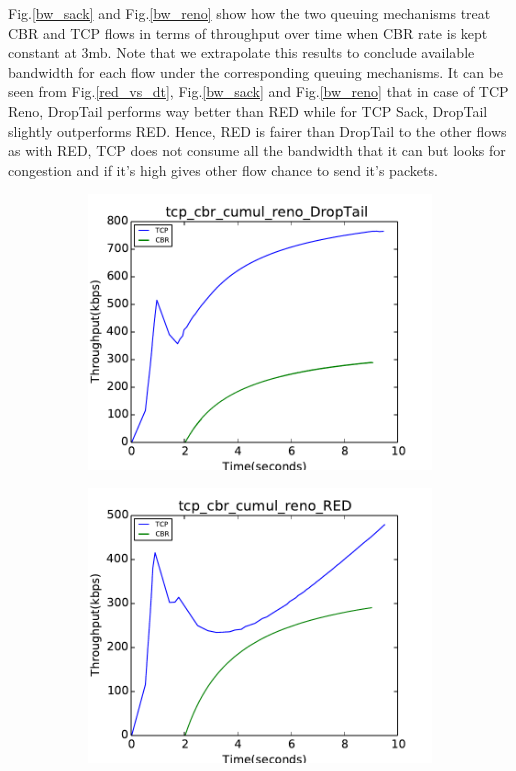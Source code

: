 \documentclass[USenglish,oneside,twocolumn]{article}
\begin{document}
Fig.\ref{bw_sack} and Fig.\ref{bw_reno} show how the two queuing mechanisms treat CBR and TCP flows in terms of throughput over time when CBR rate is kept constant at 3mb. Note that we extrapolate this results to conclude available bandwidth for each flow under the corresponding queuing mechanisms. It can be seen from Fig.\ref{red_vs_dt}, Fig.\ref{bw_sack} and Fig.\ref{bw_reno} that in case of TCP Reno, DropTail performs way better than RED while for TCP Sack, DropTail slightly outperforms RED. Hence, RED is fairer than DropTail to the other flows as with RED, TCP does not consume all the bandwidth that it can but looks for congestion and if it's high gives other flow chance to send it's packets.\\
\begin{figure}[h]
\captionsetup{justification=centering}
    \centering
    \begin{subfigure}{0.5\linewidth}
        \centering
        \includegraphics[width=\linewidth]{fig/tcp_cbr_cumul_3mb_reno_DropTail.pdf} %
    \end{subfigure}
    \begin{subfigure}{0.48\linewidth}
        \centering
        \includegraphics[width=\linewidth]{fig/tcp_cbr_cumul_3mb_reno_RED.pdf} %

\end{subfigure}
\end{figure}
\end{document}

